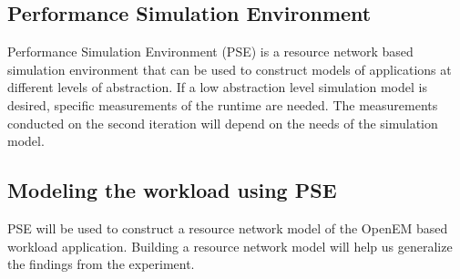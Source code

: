 \subsection{Performance Simulation Environment}
Performance Simulation Environment (PSE) is a resource network based simulation environment that can be used to construct models of applications at different levels of abstraction. If a low abstraction level simulation model is desired, specific measurements of the runtime are needed. The measurements conducted on the second iteration will depend on the needs of the simulation model.
\subsection{Modeling the workload using PSE}
PSE will be used to construct a resource network model of the OpenEM based workload application. Building a resource network model will help us generalize the findings from the experiment.